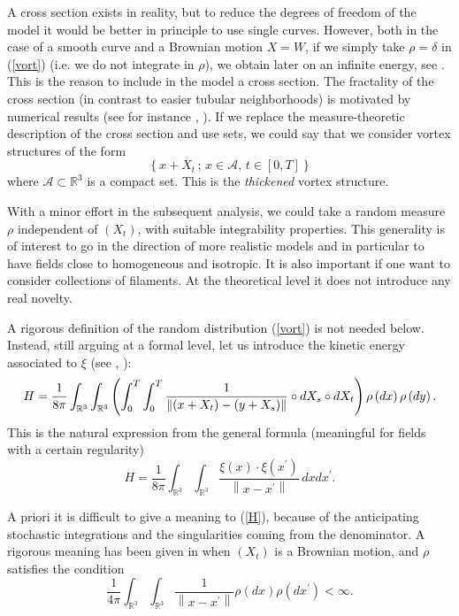 A cross section exists in reality, but to reduce the degrees of freedom of
the model it would be better in principle to use single curves. However,
both in the case of a smooth curve and a Brownian motion $X=W$, if we simply
take $\rho=\delta$ in (\ref{vort}) (i.e. we do not integrate in $\rho$), we
obtain later on an infinite energy, see \cite{Fl2}. This is the reason to
include in the model a cross section. The fractality of the cross section
(in contrast to easier tubular neighborhoods) is motivated by numerical
results (see for instance \cite{Bell-M}, \cite{Ch}). If we replace the
measure-theoretic description of the cross section
and use sets, we could say that we consider vortex structures of the form 
\begin{equation*}
\left\{ x+X_{t}\,;\,x\in\mathcal{A},\,t\in\left[ 0,T\right] \right\}
\end{equation*}
where $\mathcal{A}\subset\mathbb{R}^{3}$ is a compact set. This is the 
\textit{thickened} vortex structure.

With a minor effort in the subsequent analysis, 
we could take a random measure $\rho $
independent of $\left( X_{t}\right) $, with suitable integrability
properties. This generality is of interest to go in the direction of more
realistic models and in particular to have fields close to homogeneous and
isotropic. It is also important if one want to consider collections of
filaments. At the theoretical level it does not introduce any real novelty.

A rigorous definition of the random distribution (\ref{vort}) is not needed
below. Instead, still arguing at a formal level, let us introduce the
kinetic energy associated to $\xi $ (see \cite{Ch}, \cite{Fl2}): 
\begin{equation}
H=\frac{1}{8\pi }\int_{\mathbb{R}^{3}} \int_{\mathbb{R}^{3}} 
\left( \int_{0}^{T}\int_{0}^{T}\frac{1}{%
\left\| \left( x+X_{t}\right) -\left( y+X_{s}\right)
\right\| }\circ dX_{s}\circ dX_{t}\right) \rho \left( dx\right)
\rho \left( dy\right) .  \label{H}
\end{equation}
This is the natural expression from the general formula (meaningful for
fields with a certain regularity) 
\begin{equation}
H=\frac{1}{8\pi }\int_{\mathbb{R}^{3}}\int_{\mathbb{R}^{3}}\frac{\xi \left(
x\right) \cdot \xi \left( x^{\prime }\right) }{\left\| x-x^{\prime }\right\| }%
\,dxdx^{\prime }.
\label{eq:smoothenergy}
\end{equation}

A priori it is difficult to give a meaning to (\ref{H}), because of the
anticipating stochastic integrations and the singularities coming from the
denominator. A rigorous meaning has been given in \cite{Fl2} when $\left(
X_{t}\right) $ is a Brownian motion, and $\rho $ satisfies the condition 
\begin{equation}
\frac{1}{4\pi} \int_{\mathbb{R}^{3}} \int_{\mathbb{R}^{3}}
 \frac{1}{\left\| x-x^{\prime }\right\|} \rho \left(
dx\right) \rho \left( dx^{\prime }\right) <\infty .  \label{rho}
\end{equation}

